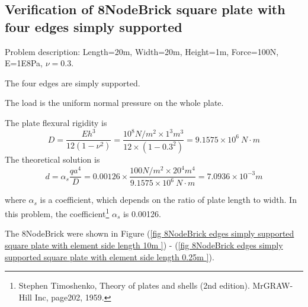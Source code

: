 \documentclass[fleqn,11pt]{article}
\begin{document}













\newpage
\subsection{Verification of 8NodeBrick square plate with four edges simply supported}

Problem description: Length=20m, Width=20m, Height=1m, Force=100N, E=1E8Pa, $\nu=0.3$. 

The four edges are simply supported. 

The load is the uniform normal pressure on the whole plate. 

The plate flexural rigidity is 
\begin{equation}
  D=\frac{Eh^3}{12(1-\nu^2)}=\frac{10^8 N/m^2 \times 1^3 m^3 }{12 \times (1-0.3^2) }= 9.1575 \times 10^6 \ N\cdot m
\end{equation}
The theoretical solution is 
\begin{equation}
  d=\alpha_s \frac{q a^4}{D}=0.00126\times \frac{100 N/m^2 \times 20^4 m^4}{9.1575 \times 10^6 \ N\cdot m}=7.0936\times 10^{-3} m
\end{equation}

where $\alpha_s$ is a coefficient, which depends on the ratio of plate length to width. In this problem, the coefficient\footnote{Stephen Timoshenko, Theory of plates and shells (2nd edition). MrGRAW-Hill Inc, page202, 1959.} $\alpha_s$ is 0.00126.


The 8NodeBrick were shown in Figure (\ref{fig 8NodeBrick edges simply supported square plate with element side length 10m }) - (\ref{fig 8NodeBrick edges simply supported square plate with element side length 0.25m }). 
\end{document}
